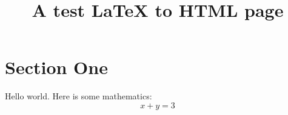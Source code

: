 \documentclass[fontsize=18pt, paper=letter]{scrartcl}
\begin{document}
	
\title{A test LaTeX to HTML page}
\maketitle


\section{Section One}

Hello world. Here is some mathematics:
	\begin{equation}
		x + y = 3
	\end{equation}
	
\end{document}
